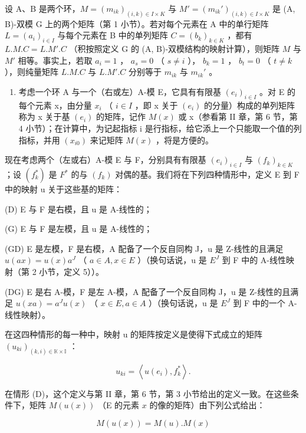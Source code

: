 设 A、B 是两个环，\(M = (m_{ik})_{(i,k) \in I \times K}\) 与 \(M' = (m_{ik}')_{(i,k) \in I \times K}\) 是 (A, B)-双模 G 上的两个矩阵（第 1 小节）。若对每个元素在 A 中的单行矩阵 \(L = (a_i)_{i \in I}\) 与每个元素在 B 中的单列矩阵 \(C = (b_k)_{k \in K}\) ，都有 \(L.M.C = L.M'.C\) （积按照定义 G 的 (A, B)-双模结构的映射计算），则矩阵 \(M\) 与 \(M'\) 相等。事实上，若取 \(a_i = 1\) ， \(a_s = 0\) （ \(s \neq i\) ）， \(b_k = 1\) ， \(b_t = 0\) （ \(t \neq k\) ），则纯量矩阵 \(L.M.C\) 与 \(L.M'.C\) 分别等于 \(m_{ik}\) 与 \(m_{ik}'\) 。

\begin{enumerate}
\def\labelenumi{\Roman{enumi}.}
\setcounter{enumi}{1}
\tightlist
\item
  考虑一个环 A 与一个（右或左）A-模 E，它具有有限基 \((e_{i})_{i\in I}\) 。对 E 的每个元素 x，由分量 \(x_{i}\) （ \(i\in I\) ，即 x 关于 \((e_{i})\) 的分量）构成的单列矩阵称为 x 关于基 \((e_{i})\) 的矩阵，记作 \(M(x)\) 或 x（参看第 II 章，第 6 节，第 4 小节）；在计算中，为记起指标 i 是行指标，给它添上一个只能取一个值的列指标，并用 \((x_{i0})\) 来记矩阵 \(M(x)\) ，将是方便的。
\end{enumerate}

现在考虑两个（左或右）A-模 E 与 F，分别具有有限基 \((e_{i})_{i\in I}\) 与 \((f_{k})_{k\in K}\) ；设 \((f_{k}^{*})\) 是 \(F^{*}\) 的与 \((f_{k})\) 对偶的基。我们将在下列四种情形中，定义 E 到 F 中的映射 u 关于这些基的矩阵：

(D) E 与 F 是右模，且 u 是 A-线性的；

(G) E 与 F 是左模，且 u 是 A-线性的；

(GD) E 是左模，F 是右模，A 配备了一个反自同构 J，u 是 Z-线性的且满足 \(u(ax) = u(x)a^{J}\) （ \(a \in A, x \in E\) ）（换句话说，u 是 \(E^{J}\) 到 F 中的 A-线性映射（第 2 小节，定义 5））。

(DG) E 是右 A-模，F 是左 A-模，A 配备了一个反自同构 J，u 是 Z-线性的且满足 \(u(xa) = a^{J}u(x)\) （ \(x \in E, a \in A\) ）（换句话说，u 是 \(E^{J}\) 到 F 中的一个 A-线性映射）。

在这四种情形的每一种中，映射 u 的矩阵按定义是使得下式成立的矩阵 \((u_{ki})_{(k,i)\in\mathbb{K}\times\mathbb{I}}\) ：

\[
u _ {k i} = \left\langle u (e _ {i}), f _ {k} ^ {*} \right\rangle .\tag{44}
\]

在情形 (D)，这个定义与第 II 章，第 6 节，第 3 小节给出的定义一致。在这些条件下，矩阵 \(M(u(x))\) （E 的元素 \(x\) 的像的矩阵）由下列公式给出：

\[
M (u (x)) = M (u). M (x)\tag{45 D}
\]

